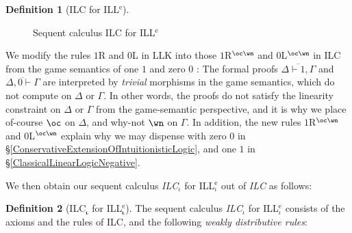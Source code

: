 \documentclass[a4paper]{article}
\theoremstyle{definition}
\newtheorem{definition}{Definition}[section]
\theoremstyle{theorem}
\theoremstyle{remark}
\begin{document}
\begin{definition}[\textsf{ILC} for ILL$^{\text{e}}$]
\begin{figure}
\caption{Sequent calculus \textsf{ILC} for ILL$^{\text{e}}$}
\label{FigILLK}
\end{figure}
\end{definition}

We modify the rules $1$R and $0$L in \textsf{LLK} into those $1$R$^{\oc\wn}$ and $0$L$^{\oc\wn}$ in \textsf{ILC} from the game semantics of one $1$ and zero $0$ \cite{laurent2002polarized}: The formal proofs $\overline{\Delta \vdash 1, \Gamma}$ and $\overline{\Delta, 0 \vdash \Gamma}$ are interpreted by \emph{trivial} morphisms in the game semantics, which do not compute on $\Delta$ or $\Gamma$.
In other words, the proofs do not satisfy the linearity constraint on $\Delta$ or $\Gamma$ from the game-semantic perspective, and it is why we place of-course $\oc$ on $\Delta$, and why-not $\wn$ on $\Gamma$.
In addition, the new rules $1$R$^{\oc\wn}$ and $0$L$^{\oc\wn}$ explain why we may dispense with zero $0$ in \S\ref{ConservativeExtensionOfIntuitionisticLogic}, and one $1$ in \S\ref{ClassicalLinearLogicNegative}.
\fi

We then obtain our sequent calculus \emph{\textsf{ILC$_\iota$}} for ILL$^{\text{e}}_\iota$ out of  \emph{\textsf{ILC}} as follows:
\begin{definition}[\textsf{ILC$_{\boldsymbol{\iota}}$} for ILL$^{\text{e}}_{\boldsymbol{\iota}}$]
\label{DefILC_Mu}
The sequent calculus \emph{\textsf{ILC$_{\iota}$}} for ILL$^{\text{e}}_\iota$ consists of the axioms and the rules of \textsf{ILC}, and the following \emph{weakly distributive rules}:
\end{definition}
\end{document}
